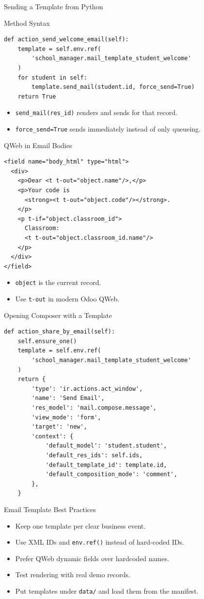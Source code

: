 \begin{frame}[fragile]{Sending a Template from Python}
\begin{block}{Method Syntax}
\begin{lstlisting}
def action_send_welcome_email(self):
	template = self.env.ref(
		'school_manager.mail_template_student_welcome'
	)
	for student in self:
		template.send_mail(student.id, force_send=True)
	return True
\end{lstlisting}
\end{block}
	\begin{itemize}
		\item \texttt{send\_mail(res\_id)} renders and sends for that record.
		\item \texttt{force\_send=True} sends immediately instead of only queueing.
	\end{itemize}
\end{frame}

\begin{frame}[fragile]{QWeb in Email Bodies}
\begin{lstlisting}[style=xml]
<field name="body_html" type="html">
  <div>
	<p>Dear <t t-out="object.name"/>,</p>
	<p>Your code is
	  <strong><t t-out="object.code"/></strong>.
	</p>
	<p t-if="object.classroom_id">
	  Classroom:
	  <t t-out="object.classroom_id.name"/>
	</p>
  </div>
</field>
\end{lstlisting}
	\begin{itemize}
		\item \texttt{object} is the current record.
		\item Use \texttt{t-out} in modern Odoo QWeb.
	\end{itemize}
\end{frame}

\begin{frame}[fragile]{Opening Composer with a Template}
\begin{lstlisting}
def action_share_by_email(self):
	self.ensure_one()
	template = self.env.ref(
		'school_manager.mail_template_student_welcome'
	)
	return {
		'type': 'ir.actions.act_window',
		'name': 'Send Email',
		'res_model': 'mail.compose.message',
		'view_mode': 'form',
		'target': 'new',
		'context': {
			'default_model': 'student.student',
			'default_res_ids': self.ids,
			'default_template_id': template.id,
			'default_composition_mode': 'comment',
		},
	}
\end{lstlisting}
\end{frame}

\begin{frame}{Email Template Best Practices}
	\begin{itemize}
		\item Keep one template per clear business event.
		\item Use XML IDs and \texttt{env.ref()} instead of hard-coded IDs.
		\item Prefer QWeb dynamic fields over hardcoded names.
		\item Test rendering with real demo records.
		\item Put templates under \texttt{data/} and load them from the manifest.
	\end{itemize}
\end{frame}
